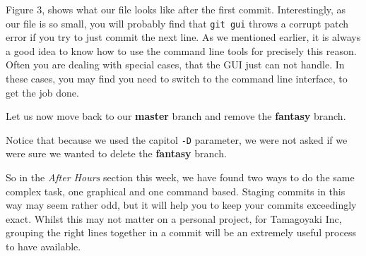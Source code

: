 Figure 3, shows what our file looks like after the first commit.  Interestingly, as our file is so small, you will probably find that \texttt{git gui} throws a corrupt patch error if you try to just commit the next line.  As we mentioned earlier, it is always a good idea to know how to use the command line tools for precisely this reason.  Often you are dealing with special cases, that the GUI just can not handle.  In these cases, you may find you need to switch to the command line interface, to get the job done.

Let us now move back to our \textbf{master} branch and remove the \textbf{fantasy} branch.


Notice that because we used the capitol \texttt{-D} parameter, we were not asked if we were sure we wanted to delete the \textbf{fantasy} branch.

So in the \emph{After Hours} section this week, we have found two ways to do the same complex task, one graphical and one command based.  Staging commits in this way may seem rather odd, but it will help you to keep your commits exceedingly exact.  Whilst this may not matter on a personal project, for Tamagoyaki Inc, grouping the right lines together in a commit will be an extremely useful process to have available.

